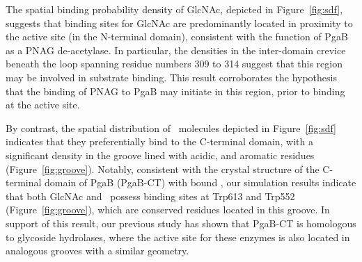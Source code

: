 The spatial binding probability density of GlcNAc, depicted in Figure~\ref{fig:sdf}, suggests that binding sites for GlcNAc are predominantly located in proximity to the active site (in the N-terminal domain), consistent with the function of PgaB as a PNAG de-acetylase. In particular, the densities in the inter-domain crevice beneath the loop spanning residue numbers 309 to 314 suggest that this region may be involved in substrate binding.  This result corroborates the hypothesis that the binding of PNAG to PgaB may initiate in this region, prior to binding at the active site.\cite{Little:2012dp} 




By contrast, the spatial distribution of \glucosamine\ molecules depicted in Figure~\ref{fig:sdf} indicates that they preferentially bind to the C-terminal domain, with a significant density in the groove lined with acidic, and aromatic residues (Figure~\ref{fig:groove}).
Notably, consistent with the crystal structure of the C-terminal domain of PgaB (PgaB-CT) with bound \glucosamine, our simulation results indicate that both GlcNAc and \glucosamine\ possess binding sites at Trp613 and Trp552  (Figure~\ref{fig:groove}), which are conserved residues located in this groove.\cite{Little:2012dp}
In support of this result, our previous study has shown that PgaB-CT is homologous to glycoside hydrolases, where the active site for these enzymes is also located in analogous grooves with a similar geometry.\cite{Little:2012dp} 

